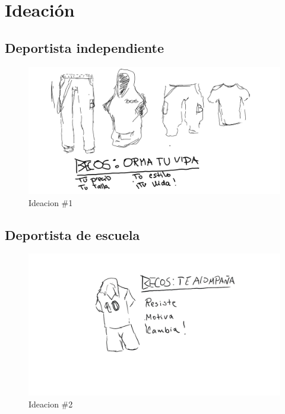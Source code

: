 \documentclass[11pt]{article}
\begin{document}
\newpage
\section{Ideación}
\label{sec:org2b197e2}
\subsection{Deportista independiente}
\label{sec:orgdecd8a1}
\begin{figure}[H]
\centering
\includegraphics[width=.9\linewidth]{./assets/build/ideacion_1.jpeg}
\caption{Ideacion \#1}
\end{figure}



\subsection{Deportista de escuela}
\label{sec:org514e8e9}

\begin{figure}[H]
\centering
\includegraphics[width=.9\linewidth]{./assets/build/ideacion_2.jpg}
\caption{Ideacion \#2}
\end{figure}
\end{document}
